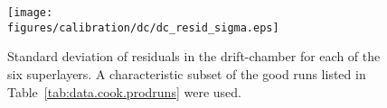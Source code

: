 \begin{figure}\begin{center}
\texttt{[image: \\figures/calibration/dc/dc\_resid\_sigma.eps]}
\caption[ Resolution (Residuals, standard dev.)]{\label{fig:data.calib.dc_res_sig}{}Standard deviation of residuals in the drift-chamber for each of the six superlayers. A characteristic subset of the good runs listed in Table~\ref{tab:data.cook.prodruns} were used.}
\end{center}\end{figure}

\clearpage
